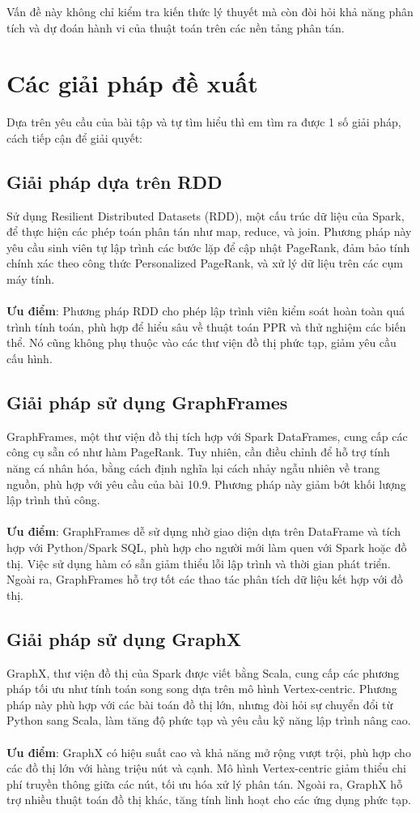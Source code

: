 \documentclass[conference]{IEEEtran}
\begin{document}
\vspace{0.5em}
Vấn đề này không chỉ kiểm tra kiến thức lý thuyết mà còn đòi hỏi khả năng phân tích và dự đoán hành vi của thuật toán trên các nền tảng phân tán.

\section{Các giải pháp đề xuất}
Dựa trên yêu cầu của bài tập và tự tìm hiểu thì em tìm ra được 1 số giải pháp, cách tiếp cận để giải quyết:
\subsection{Giải pháp dựa trên RDD}
Sử dụng Resilient Distributed Datasets (RDD), một cấu trúc dữ liệu của Spark, để thực hiện các phép toán phân tán như map, reduce, và join. Phương pháp này yêu cầu sinh viên tự lập trình các bước lặp để cập nhật PageRank, đảm bảo tính chính xác theo công thức Personalized PageRank, và xử lý dữ liệu trên các cụm máy tính.\\
\\
\textbf{Ưu điểm}: Phương pháp RDD cho phép lập trình viên kiểm soát hoàn toàn quá trình tính toán, phù hợp để hiểu sâu về thuật toán PPR và thử nghiệm các biến thể. Nó cũng không phụ thuộc vào các thư viện đồ thị phức tạp, giảm yêu cầu cấu hình.
\subsection{Giải pháp sử dụng GraphFrames}
GraphFrames, một thư viện đồ thị tích hợp với Spark DataFrames, cung cấp các công cụ sẵn có như hàm PageRank. Tuy nhiên, cần điều chỉnh để hỗ trợ tính năng cá nhân hóa, bằng cách định nghĩa lại cách nhảy ngẫu nhiên về trang nguồn, phù hợp với yêu cầu của bài 10.9. Phương pháp này giảm bớt khối lượng lập trình thủ công.\\
\\
\textbf{Ưu điểm}: GraphFrames dễ sử dụng nhờ giao diện dựa trên DataFrame và tích hợp với Python/Spark SQL, phù hợp cho người mới làm quen với Spark hoặc đồ thị. Việc sử dụng hàm có sẵn giảm thiểu lỗi lập trình và thời gian phát triển. Ngoài ra, GraphFrames hỗ trợ tốt các thao tác phân tích dữ liệu kết hợp với đồ thị.
\subsection{Giải pháp sử dụng GraphX}
GraphX, thư viện đồ thị của Spark được viết bằng Scala, cung cấp các phương pháp tối ưu như tính toán song song dựa trên mô hình Vertex-centric. Phương pháp này phù hợp với các bài toán đồ thị lớn, nhưng đòi hỏi sự chuyển đổi từ Python sang Scala, làm tăng độ phức tạp và yêu cầu kỹ năng lập trình nâng cao.\\
\\
\textbf{Ưu điểm}: GraphX có hiệu suất cao và khả năng mở rộng vượt trội, phù hợp cho các đồ thị lớn với hàng triệu nút và cạnh. Mô hình Vertex-centric giảm thiểu chi phí truyền thông giữa các nút, tối ưu hóa xử lý phân tán. Ngoài ra, GraphX hỗ trợ nhiều thuật toán đồ thị khác, tăng tính linh hoạt cho các ứng dụng phức tạp.
\end{document}
